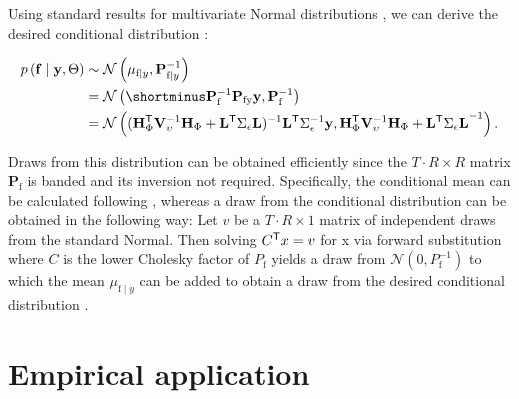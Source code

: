 \documentclass[notitlepage,a4paper,12pt]{article}
\newcommand{\transpose}[1]{{#1}^{\sf{T}}}
\begin{document}
Using standard results for multivariate Normal distributions \citep[e.g.][pp. 86-87]{bishop_prml_2006}, we can derive the desired conditional distribution \citep[see also][eqn. 5]{chanjeliazkov_2009}:

\begin{align}
    p
    \left(
        \mathbf{f} \mid \mathbf{y}, \Theta
     \right) 
    &\sim \mathcal{N}
        \left(
            \mu_{\text{f}\mid y}, \mathbf{P}_{\text{f}\mid y}^{-1}
        \right) \\
    &=    
    \mathcal{N}
        \left(
        \shortminus \mathbf{P}^{-1}_{\text{f}} \mathbf{P}_{\text{fy}} \mathbf{y}, \mathbf{P}_{\text{f}}^{-1}
        \right) \\
    &= 
    \mathcal{N}
    \left(
    (\transpose{\mathbf{H}}_{\Phi} \mathbf{V}^{-1}_{\upsilon} \mathbf{H}_{\Phi}  + \transpose{\mathbf{L}} \Sigma_{\epsilon}\mathbf{L})^{-1} \transpose{\mathbf{L}} \Sigma_{\epsilon}^{-1} \mathbf{y}, \transpose{\mathbf{H}}_{\Phi} \mathbf{V}^{-1}_{\upsilon} \mathbf{H}_{\Phi} + {\transpose{\mathbf{L}} \Sigma_{\epsilon}\mathbf{L} }^{-1}
    \right).
\end{align}

Draws from this distribution can be obtained efficiently since the $T\cdot R \times R$ matrix $\mathbf{P}_{\text{f}}$ is banded and its inversion not required. Specifically, the conditional mean can be calculated following \citet[][Algorithm 5]{rueheld_2005}, whereas a draw from the conditional distribution can be obtained in the following way: Let $v$ be a $T\cdot R \times 1$ matrix of independent draws from the standard Normal. Then solving $\transpose{C}x = v$ for x via forward substitution where $C$ is the lower Cholesky factor of $P_{\text{f}}$  yields a draw from $\mathcal{N}(0, P^{-1}_{\text{f}})$ to which the mean $\mu_{\text{f}\mid y}$ can be added to obtain a draw from the desired conditional distribution \citep[][Algorithm 4]{rueheld_2005}.

\section{Empirical application}



\end{document}
